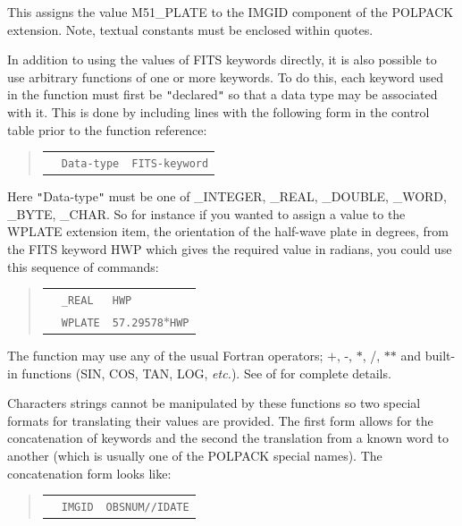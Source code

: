 \documentclass[twoside,11pt]{starlink}
\begin{document}
{{      This assigns the value M51\_PLATE to the IMGID component of the
      POLPACK extension. Note, textual constants must be enclosed within
      quotes.

      In addition to using the values of FITS keywords directly, it is also
      possible to use arbitrary functions of one or more keywords. To do
      this, each keyword used in the function must first be \texttt{"}declared\texttt{"} so
      that a data type may be associated with it. This is done by including
      lines with the following form in the control table prior to the
      function reference:

\begin{quote}
\begin{tabular}{lll}
              &  \texttt{Data-type}        & \texttt{FITS-keyword}
\end{tabular}
\end{quote}

      Here \texttt{"}Data-type\texttt{"} must be one of \_INTEGER, \_REAL, \_DOUBLE, \_WORD, \_BYTE,
      \_CHAR. So for instance if you wanted to assign a value to the WPLATE
      extension item, the orientation of the half-wave plate in degrees, from
      the FITS keyword HWP which gives the required value in radians, you
      could use this sequence of commands:

\begin{quote}
\begin{tabular}{lll}
              &  \texttt{\_REAL}        & \texttt{HWP}  \\
              &  \texttt{WPLATE}        & \texttt{57.29578$*$HWP}
\end{tabular}
\end{quote}

      The function may use any of the usual Fortran operators; $+$, -, $*$, /,
      $*$$*$ and built-in functions (SIN, COS, TAN, LOG, \emph{etc.}). See
       of
       for complete details.

      Characters strings cannot be manipulated by these functions so two
      special formats for translating their values are provided.
      The first form allows for the concatenation of keywords and
      the second the translation from a known word to another
      (which is usually one of the POLPACK special names). The
      concatenation form looks like:

\begin{quote}
\begin{tabular}{lll}
              &  \texttt{IMGID}        & \texttt{OBSNUM//IDATE}
\end{tabular}
\end{quote}

}}
\end{document}
